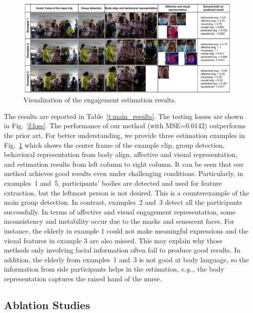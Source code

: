 \documentclass[VANCOUVER,STIX1COL]{WileyNJD-v2}
\makeatletter
\DeclareRobustCommand\onedot{\futurelet\@let@token\@onedot}
\def\@onedot{\ifx\@let@token.\else.\null\fi\xspace}
\def\eg{\emph{e.g}\onedot}
\makeatother
\begin{document}
\begin{figure}[ht]
  \centering
  \includegraphics[width=\linewidth]{assets/visualization.drawio}
  \caption{Visualization of the engagement estimation results.}
  \label{f:visualization}
\end{figure}


The results are reported in Table~\ref{t:main_results}. The testing losses are shown in Fig.~\ref{f:loss}. The performance of our method (with MSE=0.0142) outperforms the prior art.  For better understanding, we provide three estimation examples in Fig.~\ref{f:visualization} which shows the center frame of the example clip, group detection, behavioral representation from body align, affective and visual representation, and estimation results from left column to right column.  It can be seen that our method achieves good results even under challenging conditions. Particularly, in examples~1 and~5, participants' bodies are detected and used for feature extraction, but the leftmost person is not desired. This is a counterexample of the main group detection. In contrast, examples~2 and~3 detect all the participants successfully. In terms of affective and visual engagement representation, some inconsistency and instability occur due to the masks and senescent faces. For instance, the elderly in example 1 could not make meaningful expressions and the visual features in example 3 are also missed. This may explain why those methods only involving facial information often fail to produce good results. In addition, the elderly from examples~1 and~3 is not good at body language, so the information from side participants helps in the estimation, \eg, the body representation captures the raised hand of the nurse.


\subsection{Ablation Studies}
\label{subs:Ablation_Studies}
\end{document}
